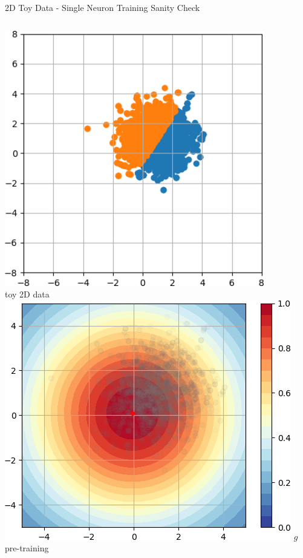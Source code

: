 \documentclass{beamer}
\begin{document}
\begin{frame}{2D Toy Data - Single Neuron Training Sanity Check}
    \begin{columns}
    \begin{column}{.31\textwidth}
        \includegraphics[width=0.85\textwidth]{images/2D-single-neuron/2d-easy-data-cropped.png}\\
        \centering\footnotesize{toy 2D data}\\
        \includegraphics[width=\textwidth]{images/2D-single-neuron/2d-easy-initialg-cropped.png}
        \centering\footnotesize{$g$ pre-training}\\
    \end{column}
    

\end{columns}
\end{frame}
\end{document}
